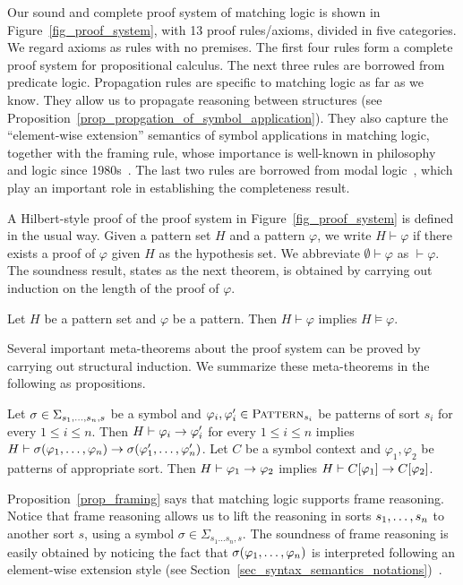 \documentclass{amsart}
\begin{document}
Our sound and complete proof system of matching logic
is shown in Figure~\ref{fig_proof_system},
with 13 proof rules/axioms, divided in five categories.
We regard axioms as rules with no premises.
The first four rules form a complete proof system for propositional calculus.
The next three rules are borrowed from predicate logic.
Propagation rules are specific to matching logic as far as we know.
They allow us to propagate reasoning between structures 
(see Proposition~\ref{prop_propgation_of_symbol_application}).
They also capture
the ``element-wise extension'' semantics of symbol applications
in matching logic,
together with the framing rule,
whose importance is well-known in philosophy and logic since 1980s~\cite{bibid}.
The last two rules are borrowed from modal logic~\cite{bibid},
which play an important role in establishing the completeness result.

A Hilbert-style proof of the proof system in Figure~\ref{fig_proof_system}
is defined in the usual way.
Given a pattern set $H$ and a pattern $\varphi$,
we write $H \vdash \varphi$ if
there exists a proof of $\varphi$ 
given $H$ as the hypothesis set.
We abbreviate $\emptyset \vdash \varphi$ as $\vdash \varphi$.
The soundness result,
states as the next theorem,
is obtained by carrying out induction on the length of the proof of $\varphi$.
\begin{theorem}[Soundness]
Let $H$ be a pattern set and $\varphi$ be a pattern.
Then $H \vdash \varphi$ implies $H \vDash \varphi$.
\end{theorem}

Several important meta-theorems about the proof system
can be proved by carrying out structural induction.
We summarize these meta-theorems in the following as propositions.

\begin{proposition}
\label{prop_framing}
Let $\sigma \in \Sigma_{s_1 ,\dots, s_n , s}$ be a symbol
and $\varphi_i, \varphi'_i \in \textnormal{\textsc{Pattern}}_{s_i}$ be patterns
of sort $s_i$ for every $1 \le i \le n$.
Then $H \vdash \varphi_i \to \varphi'_i$ for every $1 \le i \le n$
implies $H \vdash 
\sigma(\varphi_1 ,\dots, \varphi_n) \to
\sigma(\varphi'_1 ,\dots, \varphi'_n)$.
Let $C$ be a symbol context and $\varphi_1,\varphi_2$ be patterns of appropriate sort.
Then $H \vdash \varphi_1 \to \varphi_2$
implies $H \vdash C[\varphi_1] \to C[\varphi_2]$.
\end{proposition}
Proposition~\ref{prop_framing} says that matching logic
supports frame reasoning.
Notice that frame reasoning allows us to lift 
the reasoning in sorts $s_1 ,\dots, s_n$
to another sort $s$, using a symbol $\sigma \in \Sigma_{s_1 \dots s_n,s}$.
The soundness of frame reasoning is easily obtained
by noticing the fact that $\sigma(\varphi_1 ,\dots, \varphi_n)$ is interpreted
following an element-wise extension style
(see Section~\ref{sec_syntax_semantics_notations})~\cite{bibid}.
\end{document}
